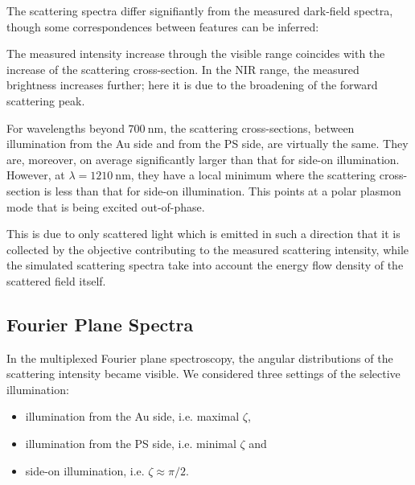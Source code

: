 \documentclass[10pt]{article}
\begin{document}
The scattering spectra differ signifiantly from the measured dark-field spectra, though some correspondences between features can be inferred: 

The measured intensity increase through the visible range coincides with the increase of the scattering cross-section. 
In the NIR range, the measured brightness increases further; here it is due to the broadening of the forward scattering peak. 

For wavelengths beyond $\SI{700}{\nano\meter}$, the scattering cross-sections, between illumination from the Au side and from the PS side, are virtually the same. 
They are, moreover, on average significantly larger than that for side-on illumination. 
However, at $\lambda=\SI{1210}{\nano\meter}$, they have a local minimum where the scattering cross-section is less than that for side-on illumination. 
This points at a polar plasmon mode that is being excited out-of-phase. 

This is due to only scattered light which is emitted in such a direction that it is collected by the objective contributing to the measured scattering intensity, while the simulated scattering spectra take into account the energy flow density of the scattered field itself. 






\subsection*{Fourier Plane Spectra}

In the multiplexed Fourier plane spectroscopy, the angular distributions of the scattering intensity became visible. 
We considered three settings of the selective illumination: 
\begin{itemize}
    \item illumination from the Au side, i.e. maximal $\zeta$,
    \item illumination from the PS side, i.e. minimal $\zeta$ and
    \item side-on illumination, i.e. $\zeta \approx \pi/2$.
\end{itemize}
\end{document}
